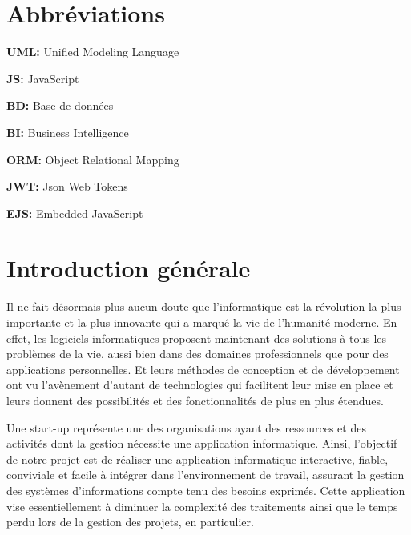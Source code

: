 

\chapter*{Abbr\'{e}viations}
\bigskip

\textbf{UML: }
Unified Modeling Language
\newline

\textbf{JS: }
JavaScript
\newline

\textbf{BD: }
Base de données
\newline

\textbf{ BI:}
Business Intelligence
\newline

\textbf{ORM: }
Object Relational Mapping
\newline

\textbf{JWT: }
Json Web Tokens
\newline

\textbf{EJS: }
Embedded JavaScript
\newline




\chapter*{Introduction g\'{e}n\'{e}rale}


Il ne fait d\'{e}sormais plus aucun doute que l'informatique est la r\'{e}volution la
plus importante et la plus innovante qui a marqu\'{e} la vie de l'humanit\'{e}
moderne. En effet, les logiciels informatiques proposent maintenant des
solutions \`{a} tous les probl\`{e}mes de la vie, aussi bien dans des domaines
professionnels que pour des applications personnelles. Et leurs m\'{e}thodes de
conception et de d\'{e}veloppement ont vu l'av\`{e}nement d'autant de technologies
qui facilitent leur mise en place et leurs donnent des possibilit\'{e}s et des
fonctionnalit\'{e}s de plus en plus \'{e}tendues.


\bigskip
Une start-up repr\'{e}sente une des organisations ayant des ressources et des
activit\'{e}s dont la gestion n\'{e}cessite une application informatique. Ainsi,
l'objectif de notre projet est de r\'{e}aliser une application informatique
interactive, fiable, conviviale et facile \`{a} int\'{e}grer dans l'environnement de
travail, assurant la gestion des syst\`{e}mes d'informations compte tenu des
besoins exprim\'{e}s. Cette application vise essentiellement \`{a} diminuer la
complexit\'{e} des traitements ainsi que le temps perdu lors de la gestion des
projets, en particulier.

